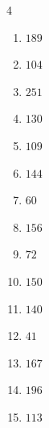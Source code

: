 \begin{multicols}{4}
\begin{enumerate}

  \item $189$


  \item $104$


  \item $251$


  \item $130$


  \item $109$


  \item $144$


  \item $60$


  \item $156$


  \item $72$


  \item $150$


\columnbreak %

\resetques

  \item $140$


  \item $41$


  \item $167$


  \item $196$


  \item $113$


\end{enumerate}
\end{multicols}
